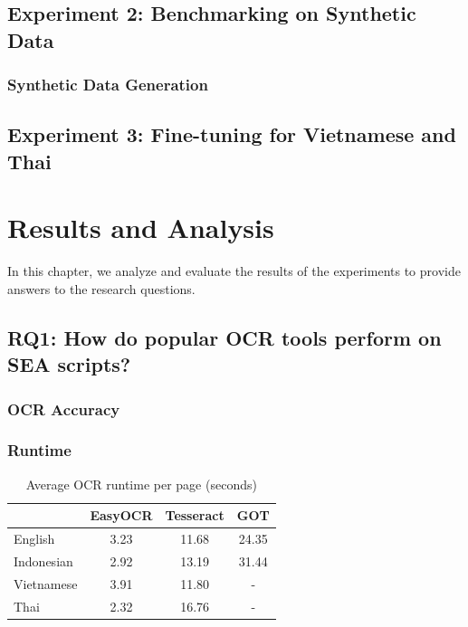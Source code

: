 \documentclass[12pt,oneside]{memoir}
\begin{document}
\section{Experiment 2: Benchmarking on Synthetic Data}

\subsection{Synthetic Data Generation}

\section{Experiment 3: Fine-tuning for Vietnamese and Thai}

\chapter{Results and Analysis}

In this chapter, we analyze and evaluate the results of the experiments to provide answers to the research questions.

\section{RQ1: How do popular OCR tools perform on SEA scripts?}

\subsection{OCR Accuracy}

\subsection{Runtime}

\begin{table}[ht]
    \caption{Average OCR runtime per page (seconds)}
    \label{table:runtime}
    \centering
    \begin{tabular}{lccc}
        \toprule
        & EasyOCR & Tesseract & GOT\\ 
        \midrule
        English & 3.23 & 11.68 & 24.35\\
        Indonesian & 2.92 & 13.19 & 31.44\\
        Vietnamese & 3.91 & 11.80 & -\\
        Thai & 2.32 & 16.76 & -\\
        \bottomrule
    \end{tabular}
\end{table}
\end{document}
